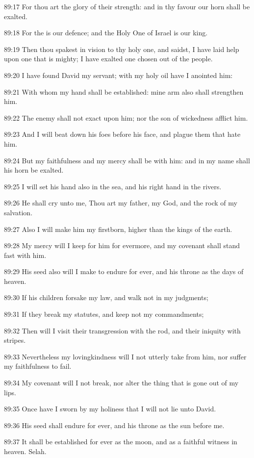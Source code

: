 89:17 For thou art the glory of their strength: and in thy favour our horn shall be exalted.

89:18 For the \LORD is our defence; and the Holy One of Israel is our king.

89:19 Then thou spakest in vision to thy holy one, and saidst, I have laid help upon one that is mighty; I have exalted one chosen out of the people.

89:20 I have found David my servant; with my holy oil have I anointed him:

89:21 With whom my hand shall be established: mine arm also shall strengthen him.

89:22 The enemy shall not exact upon him; nor the son of wickedness afflict him.

89:23 And I will beat down his foes before his face, and plague them that hate him.

89:24 But my faithfulness and my mercy shall be with him: and in my name shall his horn be exalted.

89:25 I will set his hand also in the sea, and his right hand in the rivers.

89:26 He shall cry unto me, Thou art my father, my God, and the rock of my salvation.

89:27 Also I will make him my firstborn, higher than the kings of the earth.

89:28 My mercy will I keep for him for evermore, and my covenant shall stand fast with him.

89:29 His seed also will I make to endure for ever, and his throne as the days of heaven.

89:30 If his children forsake my law, and walk not in my judgments;

89:31 If they break my statutes, and keep not my commandments;

89:32 Then will I visit their transgression with the rod, and their iniquity with stripes.

89:33 Nevertheless my lovingkindness will I not utterly take from him, nor suffer my faithfulness to fail.

89:34 My covenant will I not break, nor alter the thing that is gone out of my lips.

89:35 Once have I sworn by my holiness that I will not lie unto David.

89:36 His seed shall endure for ever, and his throne as the sun before me.

89:37 It shall be established for ever as the moon, and as a faithful witness in heaven. Selah.

